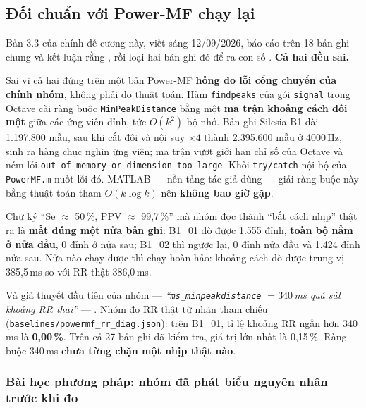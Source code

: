 \subsection{Đối chuẩn với Power-MF chạy lại}
\label{sec:powermf}

\begin{canhbao}[title={RÚT LẠI --- mọi con số Power-MF của bản 3.3 đều sai, kể cả kết luận}]
Bản 3.3 của chính đề cương này, viết sáng 12/09/2026, báo cáo  trên 18 bản ghi
chung và kết luận rằng , rồi loại hai bản ghi đó
để ra con số . \textbf{Cả hai đều sai.}

Sai vì cả hai đứng trên một bản Power-MF \textbf{hỏng do lỗi cổng chuyển của chính nhóm}, không phải do
thuật toán. Hàm \texttt{findpeaks} của gói \texttt{signal} trong Octave cài ràng buộc
\texttt{MinPeakDistance} bằng một \textbf{ma trận khoảng cách đôi một} giữa các ứng viên đỉnh, tức
$O(k^2)$ bộ nhớ. Bản ghi Silesia B1 dài 1.197.800 mẫu, sau khi cắt đôi và nội suy $\times 4$ thành
2.395.600 mẫu ở 4000\,Hz, sinh ra hàng chục nghìn ứng viên; ma trận vượt giới hạn chỉ số của Octave và
ném lỗi \texttt{out of memory or dimension too large}. Khối \texttt{try/catch} nội bộ của
\texttt{PowerMF.m} nuốt lỗi đó. MATLAB --- nền tảng tác giả dùng --- giải ràng buộc này bằng thuật toán
tham $O(k \log k)$ nên \textbf{không bao giờ gặp}.

Chữ ký ``Se $\approx$ 50\,\%, PPV $\approx$ 99,7\,\%'' mà nhóm đọc thành ``bắt cách nhịp'' thật ra là
\textbf{mất đúng một nửa bản ghi}: B1\_01 dò được 1.555 đỉnh, \textbf{toàn bộ nằm ở nửa đầu}, 0 đỉnh ở
nửa sau; B1\_02 thì ngược lại, 0 đỉnh nửa đầu và 1.424 đỉnh nửa sau. Nửa nào chạy được thì chạy hoàn
hảo: khoảng cách dò được trung vị 385,5\,ms so với RR thật 386,0\,ms.

Và giả thuyết đầu tiên của nhóm --- \textit{``\texttt{ms\_minpeakdistance} $= 340$\,ms quá sát khoảng RR
thai''} --- . Nhóm đo RR thật từ nhãn tham chiếu
(\texttt{baselines/powermf\_rr\_diag.json}): trên B1\_01, tỉ lệ khoảng RR ngắn hơn 340\,ms là
\textbf{0,00\,\%}. Trên cả 27 bản ghi đã kiểm tra, giá trị lớn nhất là 0,15\,\%. Ràng buộc 340\,ms
\textbf{chưa từng chặn một nhịp thật nào}.
\end{canhbao}

\subsubsection{Bài học phương pháp: nhóm đã phát biểu nguyên nhân trước khi đo}

